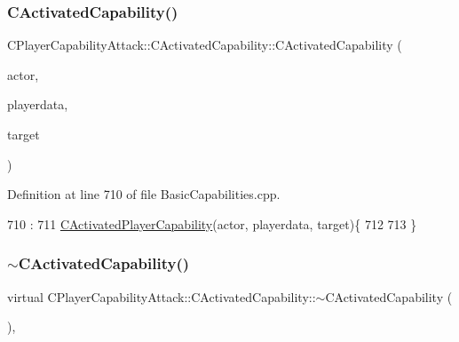 \subsubsection{\texorpdfstring{C\+Activated\+Capability()}{CActivatedCapability()}}
{\footnotesize\ttfamily C\+Player\+Capability\+Attack\+::\+C\+Activated\+Capability\+::\+C\+Activated\+Capability (\begin{DoxyParamCaption}\item[{std\+::shared\+\_\+ptr$<$ \hyperlink{classCPlayerAsset}{C\+Player\+Asset} $>$}]{actor,  }\item[{std\+::shared\+\_\+ptr$<$ \hyperlink{classCPlayerData}{C\+Player\+Data} $>$}]{playerdata,  }\item[{std\+::shared\+\_\+ptr$<$ \hyperlink{classCPlayerAsset}{C\+Player\+Asset} $>$}]{target }\end{DoxyParamCaption})}



Definition at line 710 of file Basic\+Capabilities.\+cpp.


\begin{DoxyCode}
710                                                                                                            
                                                                               :
711 \hyperlink{classCActivatedPlayerCapability_a1ece00ffb6a7b925c84dd94a7407a0d1}{CActivatedPlayerCapability}(actor, playerdata, target)\{
712 
713 \}
\end{DoxyCode}
\hypertarget{classCPlayerCapabilityAttack_1_1CActivatedCapability_a8524b57d63ce6e899630ef56326be98b}{}\label{classCPlayerCapabilityAttack_1_1CActivatedCapability_a8524b57d63ce6e899630ef56326be98b} 
\subsubsection{\texorpdfstring{$\sim$\+C\+Activated\+Capability()}{~CActivatedCapability()}}
{\footnotesize\ttfamily virtual C\+Player\+Capability\+Attack\+::\+C\+Activated\+Capability\+::$\sim$\+C\+Activated\+Capability (\begin{DoxyParamCaption}{ }\end{DoxyParamCaption})\hspace{0.3cm}{\ttfamily [inline]}, {\ttfamily [virtual]}}



